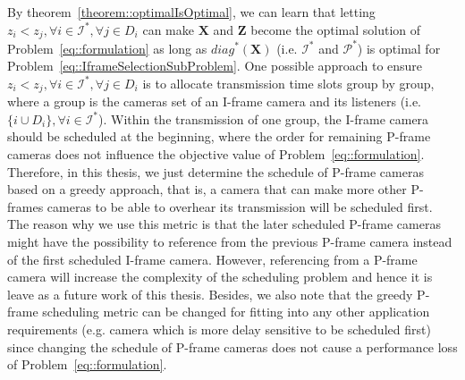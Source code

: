 By theorem~\ref{theorem::optimalIsOptimal}, we can learn that letting ${z_i < z_j}, {\forall i \in \mathcal{I}^*},{\forall j \in D_i}$ can make $\mathbf{X}$ and $\mathbf{Z}$ become the optimal solution of Problem~\eqref{eq::formulation} as long as $diag^*(\mathbf{X})$ (i.e. $\mathcal{I}^*$ and $\mathcal{P}^*$) is optimal for Problem~\eqref{eq::IframeSelectionSubProblem}.
One possible approach to ensure ${z_i < z_j}, {\forall i \in \mathcal{I}^*},{\forall j \in D_i}$ is to allocate transmission time slots group by group, where a group is the cameras set of an I-frame camera and its listeners (i.e. $\{i \cup D_i\},{\forall i \in \mathcal{I}^*}$).
Within the transmission of one group, the I-frame camera should be scheduled at the beginning, where the order for remaining P-frame cameras does not influence the objective value of Problem~\eqref{eq::formulation}.
Therefore, in this thesis, we just determine the schedule of P-frame cameras based on a greedy approach, that is, a camera that can make more other P-frames cameras to be able to overhear its transmission will be scheduled first.
The reason why we use this metric is that the later scheduled P-frame cameras might have the possibility to reference from the previous P-frame camera instead of the first scheduled I-frame camera.
However, referencing from a P-frame camera will increase the complexity of the scheduling problem and hence it is leave as a future work of this thesis.
Besides, we also note that the greedy P-frame scheduling metric can be changed for fitting into any other application requirements (e.g. camera which is more delay sensitive to be scheduled first) since changing the schedule of P-frame cameras does not cause a performance loss of Problem~\eqref{eq::formulation}.

